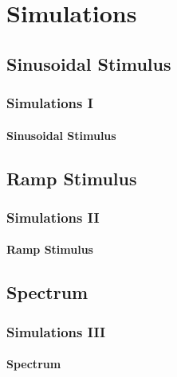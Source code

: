\documentclass{beamer}
\begin{document}
  \section{Simulations}
  \subsection{Sinusoidal Stimulus}
  \begin{frame}
    \frametitle{Simulations I}
    \framesubtitle{Sinusoidal Stimulus}
    \centering
    \resizebox{!}{0.8\textheight}{}
  \end{frame}

  \subsection{Ramp Stimulus}
  \begin{frame}
    \frametitle{Simulations II}
    \framesubtitle{Ramp Stimulus}
    \centering
    \resizebox{!}{0.8\textheight}{}
  \end{frame}

  \subsection{Spectrum}
  \begin{frame}
    \frametitle{Simulations III}
    \framesubtitle{Spectrum}
    \begin{center}
    
    \end{center}
  \end{frame}

  \AtBeginSection[]{}
\end{document}
